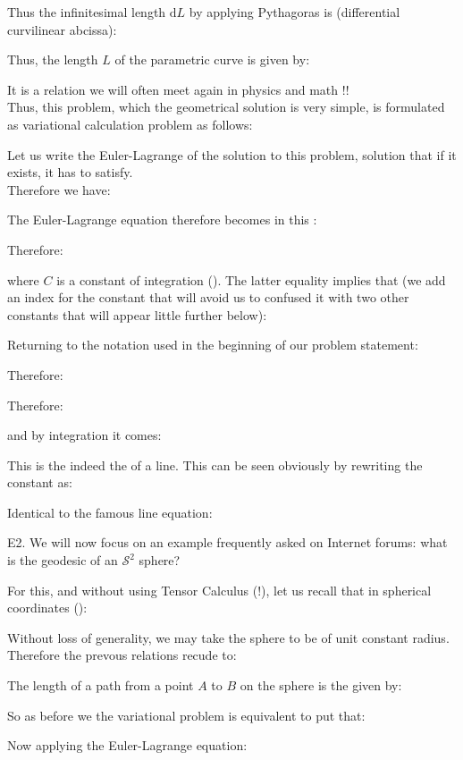 	\begin{tcolorbox}[colframe=black,colback=white,sharp corners]
	Thus the infinitesimal length $\mathrm{d}L$ by applying Pythagoras is (differential curvilinear abcissa):
	
	Thus, the length $L$ of the parametric curve is given by:
	
	It is a relation we will often meet again in physics and math !!\\
	
	Thus, this problem, which the geometrical solution is very simple, is formulated as variational calculation problem as follows:
	
	Let us write the Euler-Lagrange of the solution to this problem, solution that if it exists, it has to satisfy.\\
	
	Therefore we have:
	
	The Euler-Lagrange equation therefore becomes in this :
	
	Therefore:
	
	where $C$ is a constant of integration (). The latter equality implies that (we add an index for the constant that will avoid us to confused it with two other constants that will appear little further below):
	
	Returning to the notation used in the beginning of our problem statement:
	\end{tcolorbox}
	
	\begin{tcolorbox}[colframe=black,colback=white,sharp corners]
	
	Therefore:
	
	Therefore:
	
	and by integration it comes:
	
	This is the indeed the of a line. This can be seen obviously by rewriting the constant as:
	
	Identical to the famous line equation:
	
	
	E2. We will now focus on an example frequently asked on Internet forums: what is the geodesic of an $\mathcal{S}^2$ sphere?
	
	For this, and without using Tensor Calculus (!), let us recall that in spherical coordinates ():
	
	Without loss of generality, we may take the sphere to be of unit constant radius. Therefore the prevous relations recude to:
	
	The length of a path from a point $A$ to $B$ on the sphere is the given by:
	
	So as before we the variational problem is equivalent to put that:
	
	Now applying the Euler-Lagrange equation:
	
	\end{tcolorbox}
	
